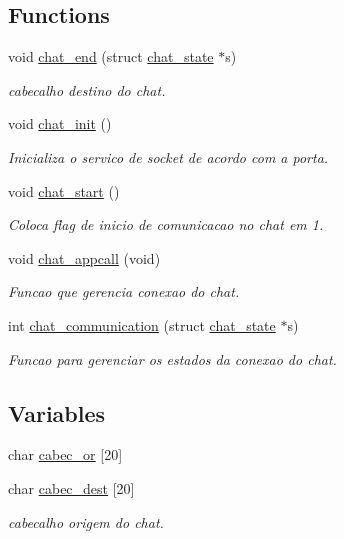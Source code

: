 \subsection*{Functions}
\begin{DoxyCompactItemize}
\item 
void \hyperlink{group__CHAT_gacc932bb3604c55fcb89a5f6d045f8da1}{chat\_\-end} (struct \hyperlink{structchat__state}{chat\_\-state} $\ast$s)
\begin{DoxyCompactList}\small\item\em cabecalho destino do chat. \item\end{DoxyCompactList}\item 
void \hyperlink{group__CHAT_ga67e501b615630d513731a410683811be}{chat\_\-init} ()
\begin{DoxyCompactList}\small\item\em Inicializa o servico de socket de acordo com a porta. \item\end{DoxyCompactList}\item 
void \hyperlink{group__CHAT_ga25b460a2990c027f8814e844fb522894}{chat\_\-start} ()
\begin{DoxyCompactList}\small\item\em Coloca flag de inicio de comunicacao no chat em 1. \item\end{DoxyCompactList}\item 
void \hyperlink{group__CHAT_ga00e5c6d3357581f7e4177b41485d8417}{chat\_\-appcall} (void)
\begin{DoxyCompactList}\small\item\em Funcao que gerencia conexao do chat. \item\end{DoxyCompactList}\item 
int \hyperlink{group__CHAT_ga4441743abd914961e74e7c4eaae43ae7}{chat\_\-communication} (struct \hyperlink{structchat__state}{chat\_\-state} $\ast$s)
\begin{DoxyCompactList}\small\item\em Funcao para gerenciar os estados da conexao do chat. \item\end{DoxyCompactList}\end{DoxyCompactItemize}
\subsection*{Variables}
\begin{DoxyCompactItemize}
\item 
char \hyperlink{group__CHAT_ga6936bd73a531977d0e65e15a3875a50e}{cabec\_\-or} \mbox{[}20\mbox{]}
\item 
char \hyperlink{group__CHAT_ga812529c69e1be053d60429b71bef09e6}{cabec\_\-dest} \mbox{[}20\mbox{]}
\begin{DoxyCompactList}\small\item\em cabecalho origem do chat. \item\end{DoxyCompactList}\end{DoxyCompactItemize}


